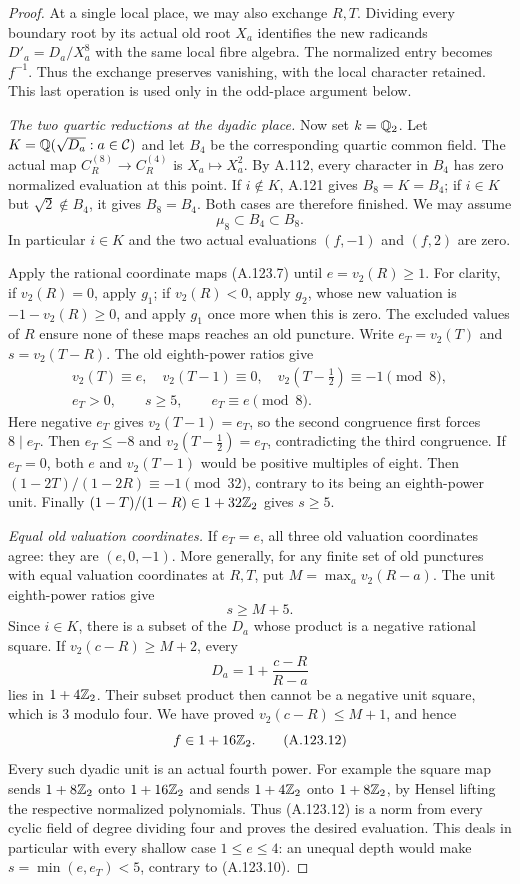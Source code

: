 \begin{proof}
At a single local place, we may also exchange $R,T$.
Dividing every boundary root by its actual old root
$X_a$ identifies the new radicands
$D'_a=D_a/X_a^8$ with the same local fibre algebra.
The normalized entry becomes $f^{-1}$.
Thus the exchange preserves vanishing, with the
local character retained.
This last operation is used only in the odd-place
argument below.

\emph{The two quartic reductions at the dyadic place.}
Now set $k=\mathbb Q_2$.
Let $K=\mathbb Q(\sqrt{D_a}:a\in\mathcal C)$ and let $B_4$
be the corresponding quartic common field.
The actual map $C_R^{(8)}\to C_R^{(4)}$ is
$X_a\mapsto X_a^2$.
By A.112, every character in $B_4$ has zero normalized
evaluation at this point.
If $i\notin K$, A.121 gives $B_8=K=B_4$; if
$i\in K$ but $\sqrt2\notin B_4$, it gives $B_8=B_4$.
Both cases are therefore finished.
We may assume
\[
                  \mu_8\subset B_4\subset B_8.
\tag{A.123.9}
\]
In particular $i\in K$ and the two actual evaluations
$(f,-1)$ and $(f,2)$ are zero.

Apply the rational coordinate maps (A.123.7) until
$e=v_2(R)\ge1$.
For clarity, if $v_2(R)=0$, apply $g_1$; if
$v_2(R)<0$, apply $g_2$, whose new valuation is
$-1-v_2(R)\ge0$, and apply $g_1$ once more when this
is zero.
The excluded values of $R$ ensure none of these
maps reaches an old puncture.
Write $e_T=v_2(T)$ and $s=v_2(T-R)$.
The old eighth-power ratios give
\[
 \begin{gathered}
 v_2(T)\equiv e,\quad v_2(T-1)\equiv0,\quad
                   v_2(T-\tfrac12)\equiv-1\pmod8,\\
 e_T>0,\qquad s\ge5,\qquad e_T\equiv e\pmod8.
 \end{gathered}
\tag{A.123.10}
\]
Here negative $e_T$ gives $v_2(T-1)=e_T$, so the
second congruence first forces $8\mid e_T$.
Then $e_T\le-8$ and $v_2(T-\tfrac12)=e_T$,
contradicting the third congruence.
If $e_T=0$, both $e$ and $v_2(T-1)$ would be positive
multiples of eight.
Then $(1-2T)/(1-2R)\equiv-1\pmod{32}$, contrary
to its being an eighth-power unit.
Finally $(1-T)/(1-R)\in1+32\mathbb Z_2$ gives $s\ge5$.

\emph{Equal old valuation coordinates.}
If $e_T=e$, all three old valuation coordinates agree:
they are $(e,0,-1)$.
More generally, for any finite set of old punctures
with equal valuation coordinates at $R,T$, put
$M=\max_a v_2(R-a)$.
The unit eighth-power ratios give
\[
                           s\ge M+5.
\tag{A.123.11}
\]
Since $i\in K$, there is a subset of the $D_a$
whose product is a negative rational square.
If $v_2(c-R)\ge M+2$, every
\[
                 D_a=1+\frac{c-R}{R-a}
\]
lies in $1+4\mathbb Z_2$.
Their subset product then cannot be a negative
unit square, which is $3$ modulo four.
We have proved $v_2(c-R)\le M+1$, and hence
\[
                          f\in1+16\mathbb Z_2.
\tag{A.123.12}
\]
Every such dyadic unit is an actual fourth power.
For example the square map sends $1+8\mathbb Z_2$ onto
$1+16\mathbb Z_2$ and sends $1+4\mathbb Z_2$ onto $1+8\mathbb Z_2$,
by Hensel lifting the respective normalized
polynomials.
Thus (A.123.12) is a norm from every cyclic field
of degree dividing four and proves the desired
evaluation.
This deals in particular with every shallow case
$1\le e\le4$: an unequal depth would make
$s=\min(e,e_T)<5$, contrary to (A.123.10).


\end{proof}
